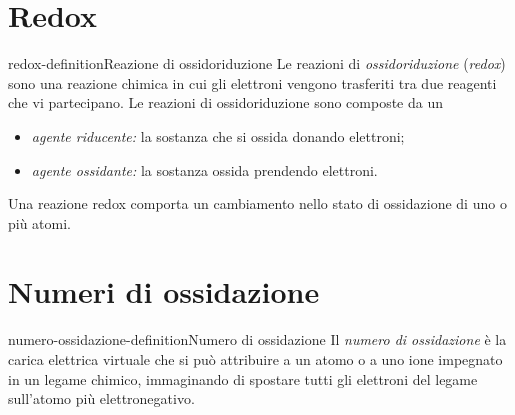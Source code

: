 \documentclass[preview]{standalone}
\begin{document}
\genpage

\section{Redox}

\begin{snippetdefinition}{redox-definition}{Reazione di ossidoriduzione}
    Le reazioni di \textit{ossidoriduzione} (\textit{redox}) sono una reazione chimica in cui gli elettroni
    vengono trasferiti tra due reagenti che vi partecipano.
    Le reazioni di ossidoriduzione sono composte da un
    \begin{itemize}
        \item \textit{agente riducente:} la sostanza che si ossida donando elettroni;
        \item \textit{agente ossidante:} la sostanza ossida prendendo elettroni.
    \end{itemize}
\end{snippetdefinition}

\begin{plainhtml}
    Una reazione redox comporta un cambiamento nello stato di ossidazione di uno o più atomi.
\end{plainhtml}

\section{Numeri di ossidazione}

\begin{snippetdefinition}{numero-ossidazione-definition}{Numero di ossidazione}
    Il \textit{numero di ossidazione} è la carica elettrica virtuale che si può
    attribuire a un atomo o a uno ione impegnato in un legame chimico,
    immaginando di spostare tutti gli elettroni del legame sull'atomo più elettronegativo.
\end{snippetdefinition}
\end{document}
